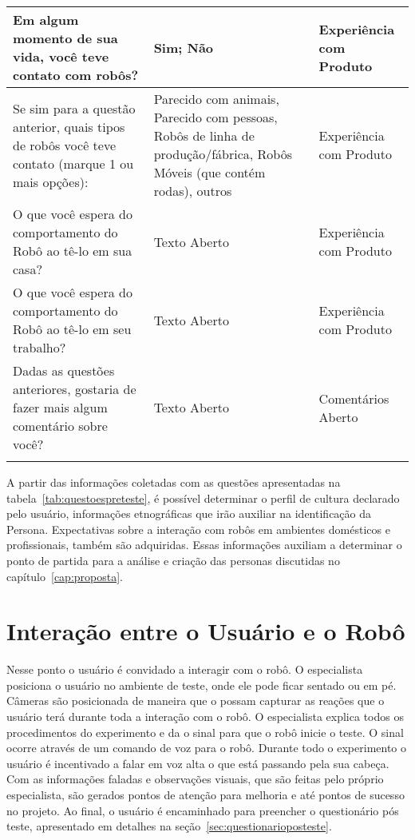 \begin{longtable}{ m{7 cm} | m{5cm} | m{4cm} }
	Em algum momento de sua vida, você teve contato com robôs? & Sim; Não & Experiência com Produto \\ \hline
	Se sim para a questão anterior, quais tipos de robôs você teve contato (marque 1 ou mais opções): & Parecido com animais, Parecido com pessoas, Robôs de linha de produção/fábrica, Robôs Móveis (que contém rodas), outros  & Experiência com Produto \\ \hline
	O que você espera do comportamento do Robô ao tê-lo em sua casa? & Texto Aberto & Experiência com Produto \\ \hline
	O que você espera do comportamento do Robô ao tê-lo em seu trabalho? & Texto Aberto & Experiência com Produto \\ \hline
	Dadas as questões anteriores, gostaria de fazer mais algum comentário sobre você? & Texto Aberto & Comentários Aberto \\ \hline
	\smallcaption{Fonte: O autor.}
\end{longtable}

A partir das informações coletadas com as questões apresentadas na tabela~\ref{tab:questoespreteste}, é possível determinar o perfil de cultura declarado pelo usuário, informações etnográficas que irão auxiliar na identificação da Persona. Expectativas sobre a interação com robôs em ambientes domésticos e profissionais, também são adquiridas. Essas informações auxiliam a determinar o ponto de partida para a análise e criação das personas discutidas no capítulo~\ref{cap:proposta}.

\section{Interação entre o Usuário e o Robô}
\label{sec:experimentointeracao}
Nesse ponto o usuário é convidado a interagir com o robô. O especialista posiciona o usuário no ambiente de teste, onde ele pode ficar sentado ou em pé. Câmeras são posicionada de maneira que o possam capturar as reações que o usuário terá durante toda a interação com o robô. O especialista explica todos os procedimentos do experimento e da o sinal para que o robô inicie o teste. O sinal ocorre através de um comando de voz para o robô. Durante todo o experimento o usuário é incentivado a falar em voz alta o que está passando pela sua cabeça. Com as informações faladas e observações visuais, que são feitas pelo próprio especialista, são gerados pontos de atenção para melhoria e até pontos de sucesso no projeto. Ao final, o usuário é encaminhado para preencher o questionário pós teste, apresentado em detalhes na seção~\ref{sec:questionarioposteste}.

